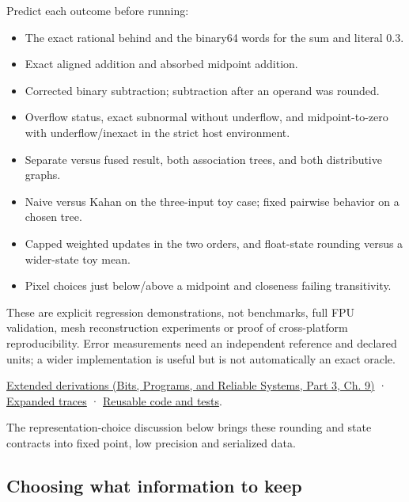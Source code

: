 \hypertarget{01-foundations-i-ch001-laboratory-and-teaching-checkpoint}{}

Predict each outcome before running:

\begin{itemize}
\tightlist
\item
  The exact rational behind  and the binary64 words for the sum and literal 0.3.
\item
  Exact aligned addition and absorbed midpoint addition.
\item
  Corrected binary subtraction; subtraction after an operand was rounded.
\item
  Overflow status, exact subnormal without underflow, and midpoint-to-zero with underflow/inexact in the strict host environment.
\item
  Separate versus fused result, both association trees, and both distributive graphs.
\item
  Naive versus Kahan on the three-input toy case; fixed pairwise behavior on a chosen tree.
\item
  Capped weighted updates in the two orders, and float-state rounding versus a wider-state toy mean.
\item
  Pixel choices just below/above a midpoint and closeness failing transitivity.
\end{itemize}

These are explicit regression demonstrations, not benchmarks, full FPU validation, mesh reconstruction experiments or proof of cross-platform reproducibility. Error measurements need an independent reference and declared units; a wider implementation is useful but is not automatically an exact oracle.

\href{../01-Bits-Programs-and-Reliable-Systems-P03/main.pdf\#nameddest=01-foundations-i-ch011-m005---representation-error-cancellation-and-rounding-graphs}{Extended derivations (Bits, Programs, and Reliable Systems, Part 3, Ch. 9)} · \hyperref[appendix-92ff77d4dfdc-m005---rounding-paths-and-update-history]{Expanded traces} · \hyperref[appendix-4e2236f53445-m005---strict-arithmetic-and-state-update-laboratory]{Reusable code and tests}.

The representation-choice discussion below brings these rounding and state contracts into fixed point, low precision and serialized data.

\subsection{Choosing what information to keep}\label{01-foundations-i-ch001-choosing-what-information-to-keep}

